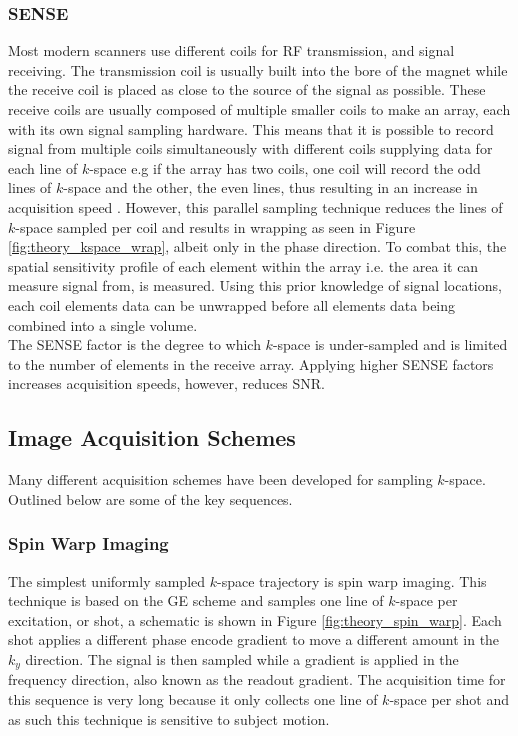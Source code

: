 \subsubsection{\ac*{SENSE}}
Most modern scanners use different coils for \ac{RF} transmission, and signal receiving. The transmission coil is usually built into the bore of the magnet while the receive coil is placed as close to the source of the signal as possible. These receive coils are usually composed of multiple smaller coils to make an array, each with its own signal sampling hardware. This means that it is possible to record signal from multiple coils simultaneously with different coils supplying data for each line of $k$-space e.g if the array has two coils, one coil will record the odd lines of $k$-space and the other, the even lines, thus resulting in an increase in acquisition speed \cite{pruessmann_sense_1999}. However, this parallel sampling technique reduces the lines of $k$-space sampled per coil and results in wrapping as seen in Figure \ref{fig:theory_kspace_wrap}, albeit only in the phase direction. To combat this, the spatial sensitivity profile of each element within the array i.e. the area it can measure signal from, is measured. Using this prior knowledge of signal locations, each coil elements data can be unwrapped before all elements data being combined into a single volume.\\

The \ac{SENSE} factor is the degree to which $k$-space is under-sampled and is limited to the number of elements in the receive array. Applying higher \ac{SENSE} factors increases acquisition speeds, however, reduces \ac{SNR}.

\subsection{Image Acquisition Schemes}

Many different acquisition schemes have been developed for sampling $k$-space. Outlined below are some of the key sequences.

\subsubsection{Spin Warp Imaging}

The simplest uniformly sampled $k$-space trajectory is spin warp imaging. This technique is based on the \ac{GE} scheme and samples one line of $k$-space per excitation, or shot, a schematic is shown in Figure \ref{fig:theory_spin_warp}. Each shot applies a different phase encode gradient to move a different amount in the $k_y$ direction. The signal is then sampled while a gradient is applied in the frequency direction, also known as the readout gradient. The acquisition time for this sequence is very long because it only collects one line of $k$-space per shot and as such this technique is sensitive to subject motion.

